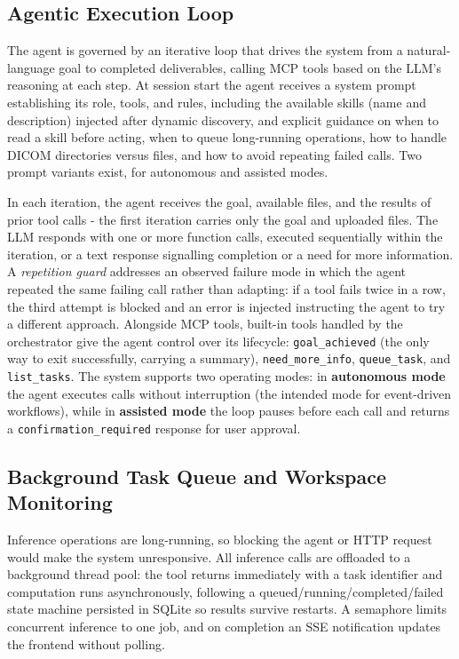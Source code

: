 \documentclass[preprint,12pt]{elsarticle}
\begin{document}
\subsection{Agentic Execution Loop}
The agent is governed by an iterative loop that drives the system from a natural-language goal to completed deliverables, calling MCP tools based on the LLM's reasoning at each step. At session start the agent receives a system prompt establishing its role, tools, and rules, including the available skills (name and description) injected after dynamic discovery, and explicit guidance on when to read a skill before acting, when to queue long-running operations, how to handle DICOM directories versus files, and how to avoid repeating failed calls. Two prompt variants exist, for autonomous and assisted modes.

In each iteration, the agent receives the goal, available files, and the results of prior tool calls - the first iteration carries only the goal and uploaded files. The LLM responds with one or more function calls, executed sequentially within the iteration, or a text response signalling completion or a need for more information. A \emph{repetition guard} addresses an observed failure mode in which the agent repeated the same failing call rather than adapting: if a tool fails twice in a row, the third attempt is blocked and an error is injected instructing the agent to try a different approach. Alongside MCP tools, built-in tools handled by the orchestrator give the agent control over its lifecycle: \texttt{goal\_achieved} (the only way to exit successfully, carrying a summary), \texttt{need\_more\_info}, \texttt{queue\_task}, and \texttt{list\_tasks}. The system supports two operating modes: in \textbf{autonomous mode} the agent executes calls without interruption (the intended mode for event-driven workflows), while in \textbf{assisted mode} the loop pauses before each call and returns a \texttt{confirmation\_required} response for user approval.

\subsection{Background Task Queue and Workspace Monitoring}
Inference operations are long-running, so blocking the agent or HTTP request would make the system unresponsive. All inference calls are offloaded to a background thread pool: the tool returns immediately with a task identifier and computation runs asynchronously, following a queued/running/completed/failed state machine persisted in SQLite so results survive restarts. A semaphore limits concurrent inference to one job, and on completion an SSE notification updates the frontend without polling.
\end{document}
